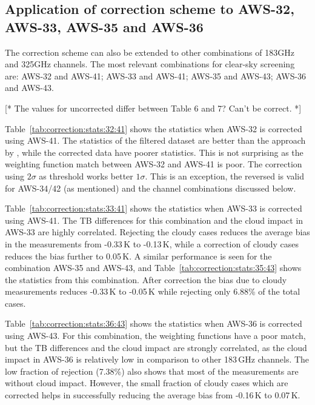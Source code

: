 \documentclass[12pt]{article}
\begin{document}
\subsection{Application of correction scheme to AWS-32, AWS-33, AWS-35 and AWS-36}
%
The correction scheme can also be extended to other combinations of 183GHz and
325GHz channels. The most relevant combinations for clear-sky screening are: AWS-32 and
AWS-41; AWS-33 and AWS-41; AWS-35 and AWS-43; AWS-36 and AWS-43.

[* The values for uncorrected differ between Table 6 and 7? Can't be correct. *]  

Table~\ref{tab:correction:stats:32:41} shows the statistics when AWS-32 is
corrected using AWS-41. The statistics of the filtered dataset are better than
the approach by \cite{rekha2012potential}, while the corrected data have poorer
statistics. This is not surprising as the weighting function match between
AWS-32 and AWS-41 is poor. The correction using $2\sigma$ as threshold works
better $1\sigma$. This is an exception, the reversed is valid for AWS-34/42 (as
mentioned) and the channel combinations discussed below.

Table~\ref{tab:correction:stats:33:41} shows the statistics when AWS-33 is
corrected using AWS-41. The TB differences for this combination and the cloud
impact in AWS-33 are highly correlated. Rejecting the cloudy cases reduces the
average bias in the measurements from -0.33\,K to -0.13\,K, while a correction
of cloudy cases reduces the bias further to 0.05\,K. A similar performance is
seen for the combination AWS-35 and AWS-43, and
Table~\ref{tab:correction:stats:35:43} shows the statistics from this
combination. After correction the bias due to cloudy measurements reduces
-0.33\,K to -0.05\,K while rejecting only 6.88\% of the total cases.
 
Table~\ref{tab:correction:stats:36:43} shows the statistics when AWS-36 is
corrected using AWS-43. For this combination, the weighting functions have a
poor match, but the TB differences and the cloud impact are strongly
correlated, as the cloud impact in AWS-36 is relatively low in comparison to
other 183\,GHz channels. The low fraction of rejection (7.38\%) also shows that
most of the measurements are without cloud impact. However, the small fraction
of cloudy cases which are corrected helps in successfully reducing the average
bias from -0.16\,K to 0.07\,K.
\end{document}
